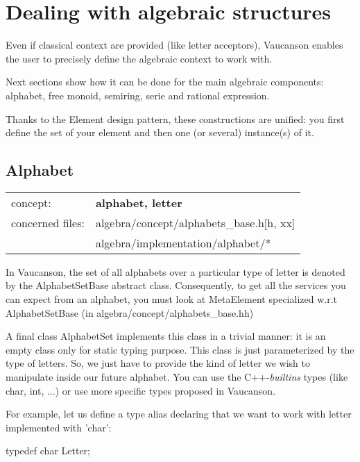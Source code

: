 \documentclass{article}
\begin{document}
\section{Dealing with algebraic structures}

Even if classical context are provided (like letter acceptors),
Vaucanson enables the user to precisely define the algebraic context
to work with. 

Next sections show how it can be done for the main algebraic
components: alphabet, free monoid, semiring, serie and rational
expression.

Thanks to the Element design pattern, these constructions are unified:
you first define the set of your element and then one (or several)
instance(s) of it.

\subsection{Alphabet}

\begin{tabular}%
{ll}
\hline 
concept: & \textbf{alphabet, letter} \\
concerned files: & algebra/concept/alphabets\_base.h[h, xx] \\
                 & algebra/implementation/alphabet/* \\
\hline 
\end{tabular}

\hspace{1cm}

In Vaucanson, the set of all alphabets over a particular type of
letter is denoted by the AlphabetSetBase abstract class. Consequently,
to get all the services you can expect from an alphabet, you must look
at MetaElement specialized w.r.t AlphabetSetBase (in
algebra/concept/alphabets\_base.hh)

A final class AlphabetSet implements this class in a trivial manner:
it is an empty class only for static typing purpose. This class is
just parameterized by the type of letters. So, we just have to provide
the kind of letter we wish to manipulate inside our future alphabet.
You can use the C++-\textit{builtins} types (like char, int, ...)  or
use more specific types proposed in Vaucanson.

For example, let us define a type alias declaring that we want to work
with letter implemented with 'char':

\begin{code}
typedef char Letter;
\end{code}
\end{document}
